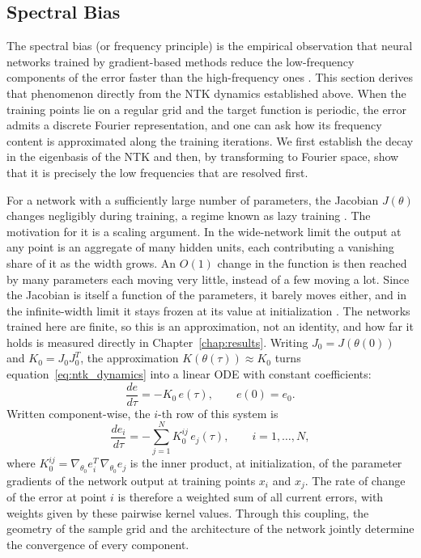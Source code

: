 \subsection{Spectral Bias}
\label{subsec:spectral_bias}

The spectral bias (or frequency principle) is the empirical observation that neural networks trained by gradient-based methods reduce the low-frequency components of the error faster than the high-frequency ones \parencite{rahaman2019}. This section derives that phenomenon directly from the NTK dynamics established above. When the training points lie on a regular grid and the target function is periodic, the error admits a discrete Fourier representation, and one can ask how its frequency content is approximated along the training iterations. We first establish the decay in the eigenbasis of the NTK and then, by transforming to Fourier space, show that it is precisely the low frequencies that are resolved first.

For a network with a sufficiently large number of parameters, the Jacobian $J(\theta)$ changes negligibly during training, a regime known as lazy training \parencite{jacot2018, chizat2019, wang2022ntk}. The motivation for it is a scaling argument. In the wide-network limit the output at any point is an aggregate of many hidden units, each contributing a vanishing share of it as the width grows. An $O(1)$ change in the function is then reached by many parameters each moving very little, instead of a few moving a lot. Since the Jacobian is itself a function of the parameters, it barely moves either, and in the infinite-width limit it stays frozen at its value at initialization \parencite{jacot2018, chizat2019}. The networks trained here are finite, so this is an approximation, not an identity, and how far it holds is measured directly in Chapter~\ref{chap:results}. Writing $J_0 = J(\theta(0))$ and $K_0 = J_0 J_0^T$, the approximation $K(\theta(\tau)) \approx K_0$ turns equation~\eqref{eq:ntk_dynamics} into a linear ODE with constant coefficients:
\begin{equation}\label{eq:error_linear_ode}
    \frac{de}{d\tau} = -K_0\,e(\tau), \qquad e(0) = e_0.
\end{equation}
Written component-wise, the $i$-th row of this system is
\begin{equation*}
    \frac{de_i}{d\tau} = -\sum_{j=1}^{N} K_0^{ij}\,e_j(\tau), \qquad i = 1,\ldots,N,
\end{equation*}
where $K_0^{ij} = \nabla_{\theta_0} e_i^T\,\nabla_{\theta_0} e_j$ is the inner product, at initialization, of the parameter gradients of the network output at training points $x_i$ and $x_j$. The rate of change of the error at point $i$ is therefore a weighted sum of all current errors, with weights given by these pairwise kernel values. Through this coupling, the geometry of the sample grid and the architecture of the network jointly determine the convergence of every component.

